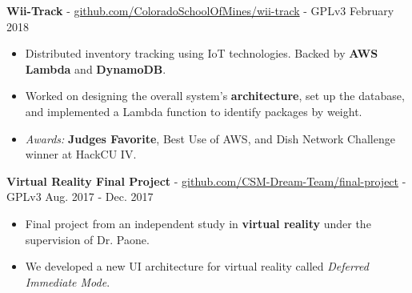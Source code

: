\documentclass[10pt,letterpaper]{article}
\begin{document}
\textbf{Wii-Track} -
\href{https://github.com/ColoradoSchoolOfMines/wii-track}{github.com/ColoradoSchoolOfMines/wii-track}
- GPLv3 \hfill February 2018
\begin{itemize}
    \item Distributed inventory tracking using IoT technologies. Backed by
        \textbf{AWS Lambda} and \textbf{DynamoDB}.
    \item Worked on designing the overall system's \textbf{architecture}, set up
        the database, and implemented a Lambda function to identify packages by
        weight.
    \item \textit{Awards:} \textbf{Judges Favorite}, Best Use of AWS, and Dish
        Network Challenge winner at HackCU IV.
\end{itemize}

\textbf{Virtual Reality Final Project} -
\href{https://github.com/CSM-Dream-Team/final-project}{github.com/CSM-Dream-Team/final-project}
- GPLv3 \hfill Aug. 2017 - Dec. 2017
\begin{itemize}
    \item Final project from an independent study in \textbf{virtual reality}
        under the supervision of Dr. Paone.
    \item We developed a new UI architecture for virtual reality called
        \textit{Deferred Immediate Mode}.
\end{itemize}
\end{document}
